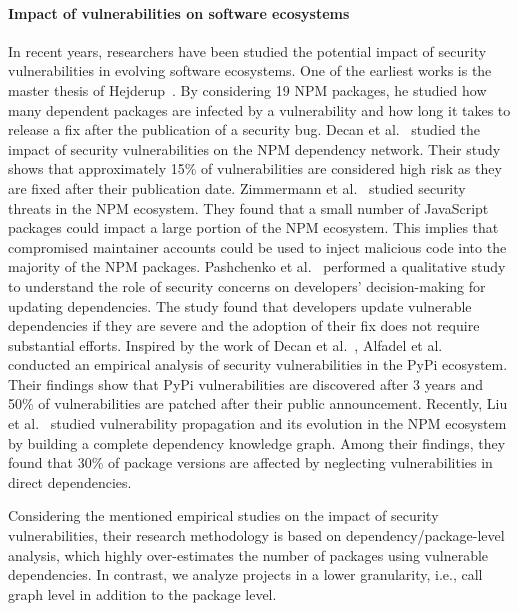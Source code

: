 \paragraph{Impact of vulnerabilities on software ecosystems}
In recent years, researchers have been studied the potential impact of security vulnerabilities in evolving software ecosystems. One of the earliest works is the master thesis of Hejderup~\cite{hejderup2015dependencies}. By considering 19 NPM packages, he studied how many dependent packages are infected by a vulnerability and how long it takes to release a fix after the publication of a security bug. 
Decan et al.~\cite{decan2018impact} studied the impact of security vulnerabilities on the NPM dependency network. Their study shows that approximately 15\% of vulnerabilities are considered high risk as they are fixed after their publication date.
Zimmermann et al.~\cite{zimmermann2019small} studied security threats in the NPM ecosystem. They found that a small number of JavaScript packages could impact a large portion of the NPM ecosystem. This implies that compromised maintainer accounts could be used to inject malicious code into the majority of the NPM packages.
Pashchenko et al.~\cite{pashchenko2020qualitative} performed a qualitative study to understand the role of security concerns on developers' decision-making for updating dependencies. The study found that developers update vulnerable dependencies if they are severe and the adoption of their fix does not require substantial efforts.
Inspired by the work of Decan et al.~\cite{decan2018impact}, Alfadel et al.~\cite{alfadel2021empirical} conducted an empirical analysis of security vulnerabilities in the PyPi ecosystem. Their findings show that PyPi vulnerabilities are discovered after 3 years and 50\% of vulnerabilities are patched after their public announcement.
Recently, Liu et al.~\cite{liu2022demystifying} studied vulnerability propagation and its evolution in the NPM ecosystem by building a complete dependency knowledge graph. Among their findings, they found that 30\% of package versions are affected by neglecting vulnerabilities in direct dependencies.

Considering the mentioned empirical studies on the impact of security vulnerabilities, their research methodology is based on dependency/package-level analysis, which highly over-estimates the number of packages using vulnerable dependencies. In contrast, we analyze projects in a lower granularity, i.e., call graph level in addition to the package level.

